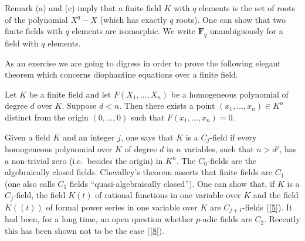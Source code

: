 \begin{statement}{Remark}
(a) and (c) imply that a finite field $K$ with $q$ elements is the set of
roots of the polynomial $X^{q}-X$ (which has exactly $q$ roots). One can
show that two finite fields with $q$ elements are isomorphic. We write
$\mathbf{F}_{q}$ unambiguously for a field with $q$ elements.
\end{statement}

As an exercise we are going to digress in order to prove the following
elegant theorem which concerns diophantine equations over a finite field.

\begin{theorem}[Chevalley]
\label{thm:I.7.2}
Let $K$ be a finite field and let $F(X_{1},\ldots,X_{n})$ be a homogeneous
polynomial of degree $d$ over $K$. Suppose $d<n$. Then there exists a point
$(x_{1},\ldots,x_{n})\in K^{n}$ distinct from the origin $(0,\ldots,0)$ such
that $F(x_{1},\ldots,x_{n})=0$.
\end{theorem}

Given a field $K$ and an integer $j$, one says that $K$ is a
$C_{j}$-field if every homogeneous polynomial over $K$ of degree $d$ in $n$
variables, such that $n>d^{j}$, has a non-trivial zero (i.e.\ besides the
origin) in $K^{n}$. The $C_{0}$-fields are the algebraically closed fields.
Chevalley's theorem asserts that finite fields are $C_{1}$ (one also calls
$C_{1}$ fields ``quasi-algebraically closed''). One can show that, if $K$ is
a $C_{j}$-field, the field $K(t)$ of rational functions in one variable over
$K$ and the field $K((t))$ of formal power series in one variable over $K$
are $C_{j+1}$-fields (\hyperref[bib:5]{[5]}). It had been, for a long time, an open question
whether $p$-adic fields are $C_{2}$. Recently this has been shown not to be
the case (\hyperref[bib:8]{[8]}).

